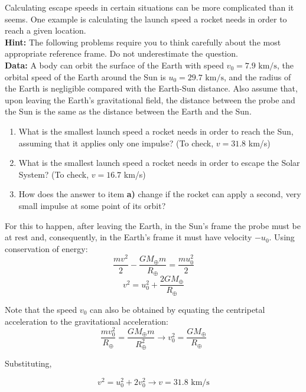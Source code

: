 \documentclass[11pt]{article}
\begin{document}
\begin{pproblem} Calculating escape speeds in certain situations can be more complicated than it seems. One example is calculating the launch speed a rocket needs in order to reach a given location.
    \\
    \textbf{Hint:} The following problems require you to think carefully about the most appropriate reference frame. Do not underestimate the question.
    \\
    \textbf{Data:} A body can orbit the surface of the Earth with speed \(v_0 = 7.9\text{ km/s}\), the orbital speed of the Earth around the Sun is \(u_0 = 29.7\text{ km/s}\), and the radius of the Earth is negligible compared with the Earth-Sun distance. Also assume that, upon leaving the Earth's gravitational field, the distance between the probe and the Sun is the same as the distance between the Earth and the Sun.
    \begin{enumerate}[label=\textbf{\alph*)}]
        \item What is the smallest launch speed a rocket needs in order to reach the Sun, assuming that it applies only one impulse? (To check, \(v = 31.8\) km/s)
        \item What is the smallest launch speed a rocket needs in order to escape the Solar System? (To check, \(v = 16.7\) km/s)
        \item How does the answer to item \textbf{a)} change if the rocket can apply a second, very small impulse at some point of its orbit?
    \end{enumerate}

    \begin{pssolution*}{}{}
        \begin{alternativas}
            \item For this to happen, after leaving the Earth, in the Sun's frame the probe must be at rest and, consequently, in the Earth's frame it must have velocity \(-u_0\). Using conservation of energy:
            \[\frac{mv^2}{2}-\frac{GM_\oplus m}{R_\oplus} = \frac{mu_0^2}{2}\]
            \[v^2 = u_0^2+\frac{2GM_\oplus}{R_\oplus}\]

            Note that the speed \(v_0\) can also be obtained by equating the centripetal acceleration to the gravitational acceleration:
            \[\frac{mv_0^2}{R_\oplus} = \frac{GM_\oplus m}{R_\oplus^2} \rightarrow v_0^2 = \frac{GM_\oplus}{R_\oplus}\]

            Substituting,

            \[v^2=u_0^2+2v_0^2 \rightarrow \boxed{v = 31.8\text{ km/s}}\]


\end{alternativas}
\end{pssolution*}
\end{pproblem}
\end{document}
